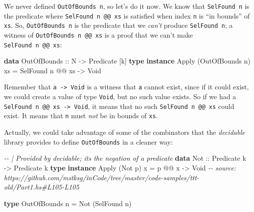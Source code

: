 \documentclass[]{article}
\newenvironment{Shaded}{}{}
\newcommand{\CommentTok}[1]{\textcolor[rgb]{0.38,0.63,0.69}{\textit{#1}}}
\newcommand{\DataTypeTok}[1]{\textcolor[rgb]{0.56,0.13,0.00}{#1}}
\newcommand{\KeywordTok}[1]{\textcolor[rgb]{0.00,0.44,0.13}{\textbf{#1}}}
\newcommand{\NormalTok}[1]{#1}
\newcommand{\OperatorTok}[1]{\textcolor[rgb]{0.40,0.40,0.40}{#1}}
\newcommand{\OtherTok}[1]{\textcolor[rgb]{0.00,0.44,0.13}{#1}}
\begin{document}
We never defined \texttt{OutOfBounds\ n}, so let's do it now. We know that
\texttt{SelFound\ n} is the predicate where \texttt{SelFound\ n\ @@\ xs} is
satisfied when index \texttt{n} is ``in bounds'' of \texttt{xs}. So,
\texttt{OutOfBounds\ n} is the predicate that we \emph{can't} produce
\texttt{SelFound\ n}; a witness of \texttt{OutOfBounds\ n\ @@\ xs} is a proof
that we can't make \texttt{SelFound\ n\ @@\ xs}:

\begin{Shaded}
\begin{Highlighting}[]
\KeywordTok{data} \DataTypeTok{OutOfBounds}\OtherTok{ ::} \DataTypeTok{N} \OtherTok{{-}\textgreater{}} \DataTypeTok{Predicate}\NormalTok{ [k]}
\KeywordTok{type} \KeywordTok{instance} \DataTypeTok{Apply}\NormalTok{ (}\DataTypeTok{OutOfBounds}\NormalTok{ n) xs }\OtherTok{=} \DataTypeTok{SelFound}\NormalTok{ n }\OperatorTok{@@}\NormalTok{ xs }\OtherTok{{-}\textgreater{}} \DataTypeTok{Void}
\end{Highlighting}
\end{Shaded}

Remember that \texttt{a\ -\textgreater{}\ Void} is a witness that \texttt{a}
cannot exist, since if it could exist, we could create a value of type
\texttt{Void}, but no such value exists. So if we had a
\texttt{SelFound\ n\ @@\ xs\ -\textgreater{}\ Void}, it means that no such
\texttt{SelFound\ n\ @@\ xs} could exist. It means that \texttt{n} must
\emph{not} be in bounds of \texttt{xs}.

Actually, we could take advantage of some of the combinators that the
\emph{decidable} library provides to define \texttt{OutOfBounds} in a cleaner
way:

\begin{Shaded}
\begin{Highlighting}[]
\CommentTok{{-}{-} | Provided by decidable; it\textquotesingle{}s the negation of a predicate}
\KeywordTok{data} \DataTypeTok{Not}\OtherTok{ ::} \DataTypeTok{Predicate}\NormalTok{ k }\OtherTok{{-}\textgreater{}} \DataTypeTok{Predicate}\NormalTok{ k}
\KeywordTok{type} \KeywordTok{instance} \DataTypeTok{Apply}\NormalTok{ (}\DataTypeTok{Not}\NormalTok{ p) x }\OtherTok{=}\NormalTok{ p }\OperatorTok{@@}\NormalTok{ x }\OtherTok{{-}\textgreater{}} \DataTypeTok{Void}
\CommentTok{{-}{-} source: https://github.com/mstksg/inCode/tree/master/code{-}samples/ttt{-}old/Part1.hs\#L105{-}L105}

\KeywordTok{type} \DataTypeTok{OutOfBounds}\NormalTok{ n }\OtherTok{=} \DataTypeTok{Not}\NormalTok{ (}\DataTypeTok{SelFound}\NormalTok{ n)}
\end{Highlighting}
\end{Shaded}
\end{document}

